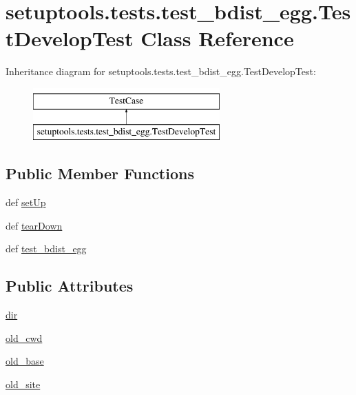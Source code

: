 \hypertarget{classsetuptools_1_1tests_1_1test__bdist__egg_1_1TestDevelopTest}{}\section{setuptools.\+tests.\+test\+\_\+bdist\+\_\+egg.\+Test\+Develop\+Test Class Reference}
\label{classsetuptools_1_1tests_1_1test__bdist__egg_1_1TestDevelopTest}
Inheritance diagram for setuptools.\+tests.\+test\+\_\+bdist\+\_\+egg.\+Test\+Develop\+Test\+:\begin{figure}[H]
\begin{center}
\leavevmode
\includegraphics[height=2.000000cm]{classsetuptools_1_1tests_1_1test__bdist__egg_1_1TestDevelopTest}
\end{center}
\end{figure}
\subsection*{Public Member Functions}
\begin{DoxyCompactItemize}
\item 
def \hyperlink{classsetuptools_1_1tests_1_1test__bdist__egg_1_1TestDevelopTest_a9f27c00237b0a85e92c61cf7c4f50463}{set\+Up}
\item 
def \hyperlink{classsetuptools_1_1tests_1_1test__bdist__egg_1_1TestDevelopTest_aa67569ba623ae6b83c91da1473f809fc}{tear\+Down}
\item 
def \hyperlink{classsetuptools_1_1tests_1_1test__bdist__egg_1_1TestDevelopTest_ac02514bc357ec09312d6918c04b3109a}{test\+\_\+bdist\+\_\+egg}
\end{DoxyCompactItemize}
\subsection*{Public Attributes}
\begin{DoxyCompactItemize}
\item 
\hyperlink{classsetuptools_1_1tests_1_1test__bdist__egg_1_1TestDevelopTest_a5ba4b02f8574a413ad58f20182f693f5}{dir}
\item 
\hyperlink{classsetuptools_1_1tests_1_1test__bdist__egg_1_1TestDevelopTest_ad318c0a4753477eeade86fb4444f4175}{old\+\_\+cwd}
\item 
\hyperlink{classsetuptools_1_1tests_1_1test__bdist__egg_1_1TestDevelopTest_a8ce1daa06c534f41a9f1e9e1baef89b8}{old\+\_\+base}
\item 
\hyperlink{classsetuptools_1_1tests_1_1test__bdist__egg_1_1TestDevelopTest_a65b00431053def3c13d1044b4d8af8cb}{old\+\_\+site}
\end{DoxyCompactItemize}


